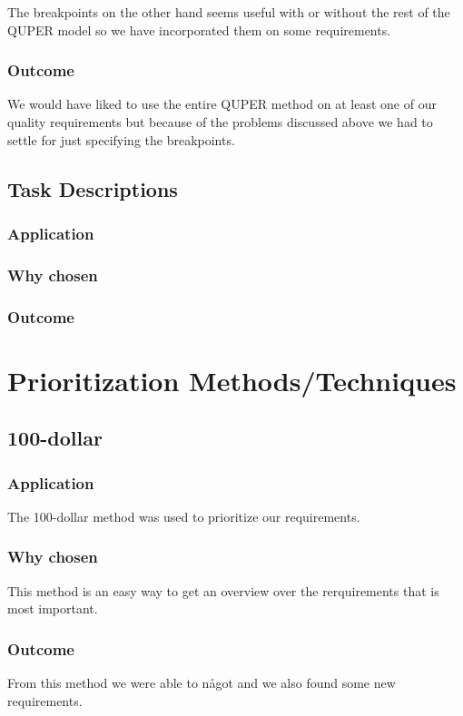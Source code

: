 \documentclass[a4paper]{article}
\begin{document}
    	The breakpoints on the other hand seems useful with or without the rest of the QUPER model so we have incorporated them on some requirements.

	    \subsubsection{Outcome}
		We would have liked to use the entire QUPER method on at least one of our quality requirements but because of the problems discussed above we had to settle for just specifying the breakpoints.		
		
		
	\subsection{Task Descriptions}
	    \subsubsection{Application}
    	\subsubsection{Why chosen}
    	\subsubsection{Outcome}


	\section{Prioritization Methods/Techniques}

  \subsection{100-dollar}
    \subsubsection{Application}
      The 100-dollar method was used to prioritize our requirements. 
    \subsubsection{Why chosen}
      This method is an easy way to get an overview over the rerquirements that is most important.
    \subsubsection{Outcome}
      From this method we were able to något and we also found some new requirements.
\end{document}
